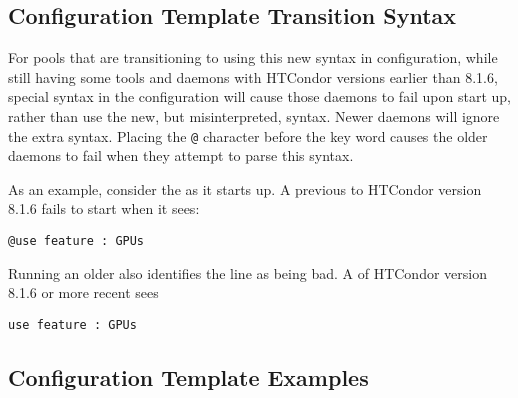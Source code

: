 \subsection{\label{sec:Config-Template-Transition-Syntax}Configuration
Template Transition Syntax}

For pools that are transitioning to using this new syntax in configuration,
while still having some tools and daemons with HTCondor versions 
earlier than 8.1.6,
special syntax in the configuration will cause those daemons to
fail upon start up,
rather than use the new, but misinterpreted, syntax. 
Newer daemons will ignore the extra syntax.
Placing the \verb|@| character before the  key word
causes the older daemons to fail when they attempt to
parse this syntax.

As an example, consider the  as it starts up.
A  previous to HTCondor version 8.1.6 fails to start
when it sees:
\begin{verbatim}
@use feature : GPUs
\end{verbatim}
Running an older  also identifies the 
line as being bad.
A  of HTCondor version 8.1.6 or more recent sees
\begin{verbatim}
use feature : GPUs
\end{verbatim}

\subsection{\label{sec:Config-Template-Examples}Configuration Template
Examples}

